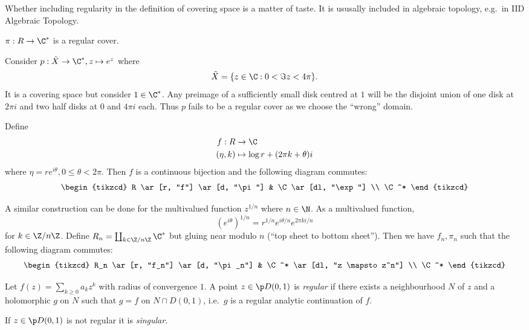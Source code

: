 \documentclass[a4paper]{article}
\begin{document}
\begin{note}
  Whether including regularity in the definition of covering space is a matter of taste. It is ususally included in algebraic topology, e.g.\ in IID Algebraic Topology.
\end{note}

\begin{remark}
  \(\pi: R \to \C^*\) is a regular cover.
\end{remark}

\begin{eg}
  Consider \(p: \tilde X \to \C^*, z \mapsto e^z\) where
  \[
    \tilde X = \{z \in \C: 0 < \Im z < 4\pi\}.
  \]
  It is a covering space but consider \(1 \in \C^*\). Any preimage of a sufficiently small disk centred at \(1\) will be the disjoint union of one disk at \(2\pi i\) and two half disks at \(0\) and \(4\pi i\) each. Thus \(p\) fails to be a regular cover as we choose the ``wrong'' domain.
\end{eg}

Define
\begin{align*}
  f: R &\to \C \\
  (\eta, k) &\mapsto \log r + (2\pi k + \theta) i
\end{align*}
where \(\eta = re^{i\theta}, 0 \leq \theta < 2\pi\). Then \(f\) is a continuous bijection and the following diagram commutes:
\[
  \begin{tikzcd}
    R \ar[r, "f"] \ar[d, "\pi"] & \C \ar[dl, "\exp"] \\
    \C^*
  \end{tikzcd}
\]

A similar construction can be done for the multivalued function \(z^{1/n}\) where \(n \in \N\). As a multivalued function,
\[
  (e^{i\theta})^{1/n} = r^{1/n} e^{i\theta/n} e^{2\pi ki/n}
\]
for \(k \in \Z/n\Z\). Define \(R_n = \coprod_{k \in \Z/n\Z} \C^*\) but gluing near modulo \(n\) (``top sheet to bottom sheet''). Then we have \(f_n, \pi_n\) such that the following diagram commutes:
\[
  \begin{tikzcd}
    R_n \ar[r, "f_n"] \ar[d, "\pi_n"] & \C^* \ar[dl, "z \mapsto z^n"] \\
    \C^*
  \end{tikzcd}
\]

\begin{definition}
  Let \(f(z) = \sum_{k \geq 0} a_k z^k\) with radius of convergence \(1\). A point \(z \in \p D(0, 1)\) is \emph{regular} if there exists a neighbourhood \(N\) of \(z\) and a holomorphic \(g\) on \(N\) such that \(g = f\) on \(N \cap D(0, 1)\), i.e.\ \(g\) is a regular analytic continuation of \(f\).

  If \(z \in \p D(0, 1)\) is not regular it is \emph{singular}.
\end{definition}
\end{document}
